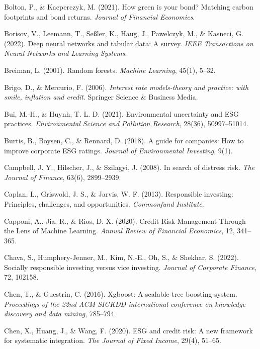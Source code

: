 \begin{thebibliography}{100}
Bolton, P., \& Kacperczyk, M. (2021). How green is your bond? Matching carbon footprints and bond returns. \textit{Journal of Financial Economics}.

Borisov, V., Leemann, T., Seßler, K., Haug, J., Pawelczyk, M., \& Kasneci, G. (2022). Deep neural networks and tabular data: A survey. \textit{IEEE Transactions on Neural Networks and Learning Systems}.

Breiman, L. (2001). Random forests. \textit{Machine Learning}, 45(1), 5--32.

Brigo, D., \& Mercurio, F. (2006). \textit{Interest rate models-theory and practice: with smile, inflation and credit}. Springer Science \& Business Media.

Bui, M.-H., \& Huynh, T. L. D. (2021). Environmental uncertainty and ESG practices. \textit{Environmental Science and Pollution Research}, 28(36), 50997--51014.

Burtis, B., Boysen, C., \& Rennard, D. (2018). A guide for companies: How to improve corporate ESG ratings. \textit{Journal of Environmental Investing}, 9(1).

Campbell, J. Y., Hilscher, J., \& Szilagyi, J. (2008). In search of distress risk. \textit{The Journal of Finance}, 63(6), 2899--2939.

Caplan, L., Griswold, J. S., \& Jarvis, W. F. (2013). Responsible investing: Principles, challenges, and opportunities. \textit{Commonfund Institute}.

Capponi, A., Jia, R., \& Rios, D. X. (2020). Credit Risk Management Through the Lens of Machine Learning. \textit{Annual Review of Financial Economics}, 12, 341--365.

Chava, S., Humphery-Jenner, M., Kim, N.-E., Oh, S., \& Shekhar, S. (2022). Socially responsible investing versus vice investing. \textit{Journal of Corporate Finance}, 72, 102158.

Chen, T., \& Guestrin, C. (2016). Xgboost: A scalable tree boosting system. \textit{Proceedings of the 22nd ACM SIGKDD international conference on knowledge discovery and data mining}, 785--794.

Chen, X., Huang, J., \& Wang, F. (2020). ESG and credit risk: A new framework for systematic integration. \textit{The Journal of Fixed Income}, 29(4), 51--65.


\end{thebibliography}
